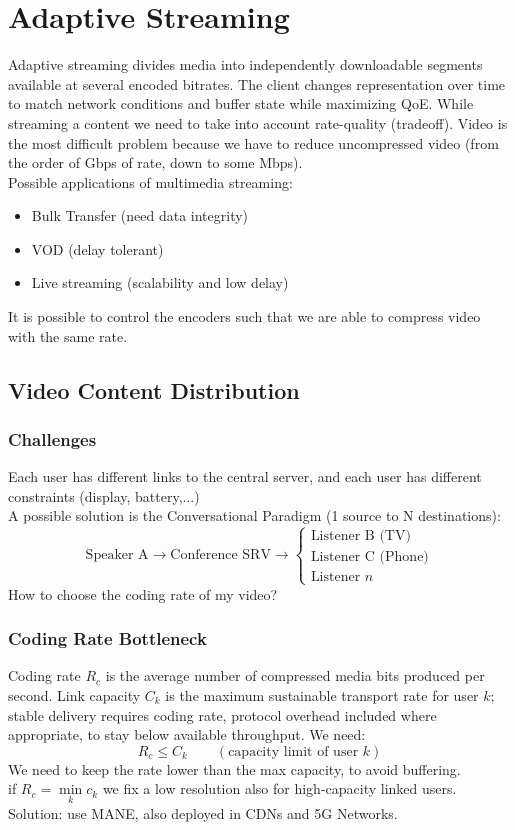 \section{Adaptive Streaming}
Adaptive streaming divides media into independently downloadable segments available at several encoded bitrates. The client changes representation over time to match network conditions and buffer state while maximizing QoE.
While streaming a content we need to take into account rate-quality (tradeoff). Video is the most difficult problem because we have to reduce uncompressed video (from the order of Gbps of rate, down to some Mbps).\\
Possible applications of multimedia streaming:\begin{itemize}
    \item Bulk Transfer (need data integrity)
    \item VOD (delay tolerant)
    \item Live streaming (scalability and low delay)
\end{itemize}
It is possible to control the encoders such that we are able to compress video with the same rate.
\subsection{Video Content Distribution}
\subsubsection{Challenges}
Each user has different links to the central server, and each user has different constraints (display, battery,...)\\
A possible solution is the Conversational Paradigm (1 source to N destinations):
$$\boxed{\text{Speaker A}} \longrightarrow \boxed{\text{Conference SRV}} \longrightarrow \begin{cases}
    \boxed{\text{Listener B (TV)}}\\
    \boxed{\text{Listener C (Phone)}}\\
    \boxed{\text{Listener }n}
\end{cases}$$
How to choose the coding rate of my video?
\subsubsection{Coding Rate Bottleneck}
Coding rate $R_c$ is the average number of compressed media bits produced per second. Link capacity $C_k$ is the maximum sustainable transport rate for user $k$; stable delivery requires coding rate, protocol overhead included where appropriate, to stay below available throughput.
We need:
$$R_c \leq C_k \qquad (\text{capacity limit of user }k)$$
We need to keep the rate lower than the max capacity, to avoid buffering.\\
if $R_c = \min\limits_k c_k$ we fix a low resolution also for high-capacity linked users.\\
Solution: use MANE, also deployed in CDNs and 5G Networks.
